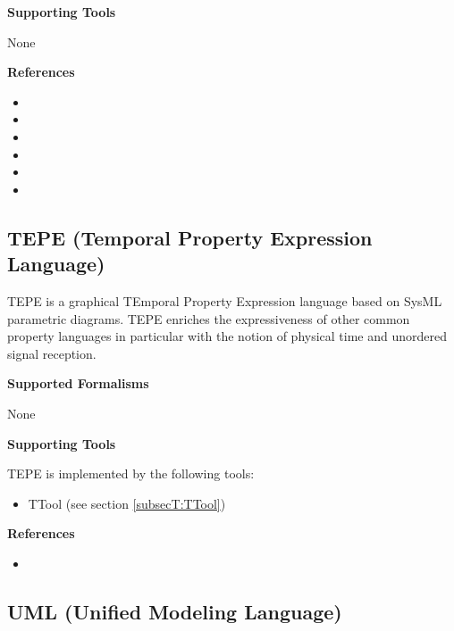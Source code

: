 \textbf{Supporting Tools}

None


\textbf{References}
\begin{itemize}
	
\item {}
	
\item {}
	
\item {}
	
\item {}
	
\item {}
	
\item {}
\end{itemize}



\subsection{TEPE (Temporal Property Expression Language)}
\label{subsecL:TEPE}


TEPE is a graphical TEmporal Property Expression language based on SysML parametric diagrams. TEPE enriches the expressiveness of other common property languages in particular with the notion of physical time and unordered signal reception.

\textbf{Supported Formalisms}

None


\textbf{Supporting Tools}

TEPE is implemented by the following tools:
\begin{itemize}
	\item TTool (see section \ref{subsecT:TTool})
\end{itemize}


\textbf{References}
\begin{itemize}
	
\item {}
\end{itemize}



\subsection{UML (Unified Modeling Language)}
\label{subsecL:UML}


